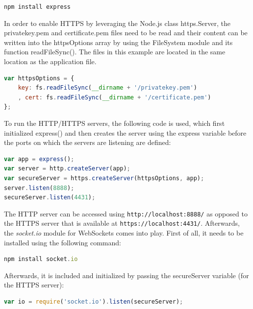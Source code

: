 \begin{lstlisting}[language=javascript,caption={Installing Express via command-line}]
npm install express 
\end{lstlisting}

In order to enable HTTPS by leveraging the Node.js class https.Server, the privatekey.pem and certificate.pem files need to be read and their content can be written into the httpsOptions array by using the FileSystem module and its function readFileSync(). The files in this example are located in the same location as the application file.

\begin{lstlisting}[language=javascript,caption={Reading encryption keys}]
var httpsOptions = {
    key: fs.readFileSync(__dirname + '/privatekey.pem')
    , cert: fs.readFileSync(__dirname + '/certificate.pem')
};
\end{lstlisting}

To run the HTTP/HTTPS servers, the following code is used, which first
initialized express() and then creates the server using the express variable
before the ports on which the servers are listening are defined:

\begin{lstlisting}[language=javascript,caption={Starting servers in Node.js}]
var app = express();
var server = http.createServer(app);
var secureServer = https.createServer(httpsOptions, app);
server.listen(8888);
secureServer.listen(4431);
\end{lstlisting}

The HTTP server can be accessed using \texttt{http://localhost:8888/} as opposed to the
HTTPS server that is available at \texttt{https://localhost:4431/}. Afterwards, the
\textit{socket.io} module for WebSockets comes into play. First of all, it needs to be
installed using the following command:

\begin{lstlisting}[language=javascript,caption={Command to install socket.io via Node.js' package manager}]
npm install socket.io
\end{lstlisting}

Afterwards, it is included and initialized by passing the secureServer variable
(for the HTTPS server):

\begin{lstlisting}[language=javascript,caption={Initialisation of the socket.io module in Node.js}]
var io = require('socket.io').listen(secureServer);
\end{lstlisting}

